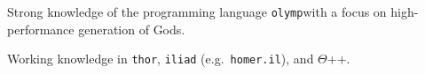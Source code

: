 Strong knowledge of the programming language \texttt{olymp}\footnotemark with a focus on high-performance generation of Gods.

Working knowledge in \texttt{thor}, \texttt{iliad} (e.g.~\texttt{homer.il}), and $\Theta\text{++}$.

